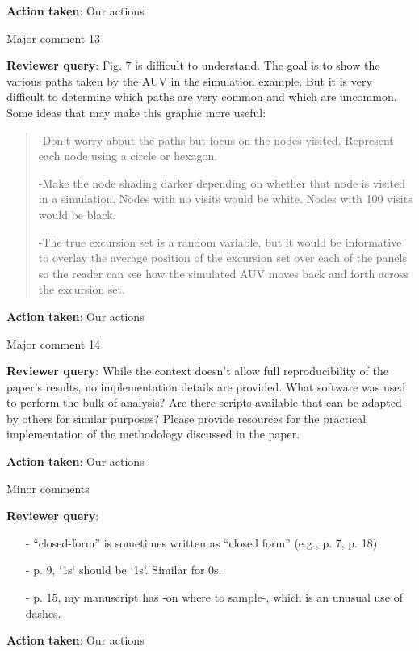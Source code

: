 \documentclass[a4paper]{article}
\def\reply{\textbf{Reviewer query}}
\def\action{\textbf{Action taken}}
\begin{document}
\begin{answers}
\action: Our actions

\item{Major comment 13}\label{q24}

\reply: Fig. 7 is difficult to understand. The goal is to show the various paths taken by the AUV in the
simulation example. But it is very difficult to determine which paths are very common and which
are uncommon. Some ideas that may make this graphic more useful:

\begin{quote}
-Don’t worry about the paths but focus on the nodes visited. Represent each node using a circle or hexagon.\par
-Make the node shading darker depending on whether that node is visited in a
simulation. Nodes with no visits would be white. Nodes with 100 visits would be black.\par
-The true excursion set is a random variable, but it would be informative to overlay the
average position of the excursion set over each of the panels so the reader can see how
the simulated AUV moves back and forth across the excursion set.
\end{quote}

\action: Our actions

\item{Major comment 14}\label{q25}

\reply: While the context doesn’t allow full reproducibility of the paper’s results, no implementation details are provided. What software was used to perform the bulk of analysis? Are there scripts available that can be adapted by others for similar purposes? Please provide resources for the practical implementation of the methodology discussed in the paper.

\action: Our actions

\item{Minor comments}\label{q26}

\reply: \begin{itemize}[noitemsep,topsep=0pt,parsep=0pt,partopsep=0pt]

\item[-] “closed-form” is sometimes written as “closed form” (e.g., p. 7, p. 18)

\item[-] p. 9, `1s` should be ‘1s’. Similar for 0s.

\item[-] p. 15, my manuscript has -on where to sample-, which is an unusual use of dashes.

\end{itemize}

\action: Our actions

\end{answers}
\end{document}
